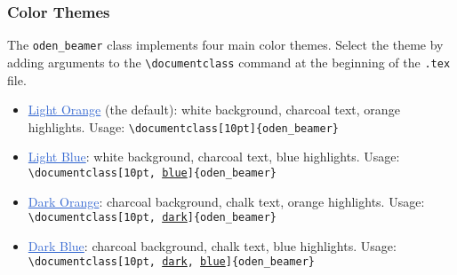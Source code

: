 \documentclass[10pt, aspectratio=169]{oden_beamer}
\begin{document}
\begin{frame} %
\frametitle{Color Themes}
The \texttt{oden\_beamer} class implements four main color themes.
Select the theme by adding arguments to the \texttt{\textbackslash documentclass} command at the beginning of the \texttt{.tex} file.
\begin{itemize} %
    \item<2-> \textcolor{highlight}{\underline{Light Orange}} (the default): white background, charcoal text, orange highlights.
    Usage: \texttt{\textbackslash documentclass[10pt]\{oden\_beamer\}}
    \vspace{.1cm}
    \item<2-> \textcolor{highlight}{\underline{Light Blue}}: white background, charcoal text, blue highlights.
    Usage: \texttt{\textbackslash documentclass[10pt, \underline{blue}]\{oden\_beamer\}}
    \vspace{.1cm}
    \item<3-> \textcolor{highlight}{\underline{Dark Orange}}: charcoal background, chalk text, orange highlights.
    Usage: \texttt{\textbackslash documentclass[10pt, \underline{dark}]\{oden\_beamer\}}
    \vspace{.1cm}
    \item<3-> \textcolor{highlight}{\underline{Dark Blue}}: charcoal background, chalk text, blue highlights.
    Usage: \texttt{\textbackslash documentclass[10pt, \underline{dark}, \underline{blue}]\{oden\_beamer\}}
\end{itemize}

\vspace{.25cm}
\end{frame}
\end{document}

